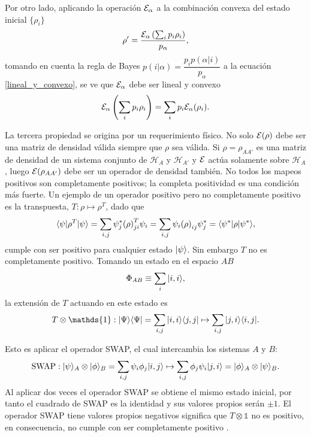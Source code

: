 Por otro lado, aplicando la operación $\mathcal{E}_\alpha$  a la combinación convexa del estado inicial $\{\rho_i\}$ \begin{equation}
    \rho'=\dfrac{\mathcal{E}_\alpha\left(\sum_i p_i \rho_i\right)}{p_\alpha},
\end{equation} tomando en cuenta la regla de Bayes  $p(i|\alpha)=\dfrac{p_i p(\alpha|i)}{ p_\alpha} $ a la ecuación {\ref{lineal_y_convexo}},  se ve que $\mathcal{E}_\alpha$ debe ser lineal y convexo {\cite{preskill2020quantum}} \begin{equation}
    \mathcal{E}_\alpha\left(\sum_i p_i \rho_i\right)=\sum_i p_i\mathcal{E}_\alpha(\rho_i). 
\end{equation}

La tercera propiedad se origina por un requerimiento físico. No solo $\mathcal{E}(\rho)$ debe ser una matriz de densidad válida siempre que $\rho$ sea válida. Si $\rho=\rho_{AA'}$ es una matriz de densidad de un sistema conjunto de $\mathcal{H}_A$ y $\mathcal{H}_{A'}$  y $\mathcal{E}$ actúa solamente sobre $\mathcal{H}_A$, luego $\mathcal{E}(\rho_{AA'})$  debe ser un operador de densidad también. No todos los mapeos positivos son completamente positivos; la completa positividad es una condición más fuerte. Un ejemplo de un operador positivo pero no completamente positivo es la transpuesta, $T:\rho \mapsto {\rho}^T$, dado que \[\langle \psi |{\rho}^T| \psi \rangle=\sum_{i,j} \psi _j^* {(\rho)}^T _{ji} \psi _i=\sum _{i,j} \psi _i{(\rho)} _{ij} \psi_j^{*}=\langle {\psi}^*|\rho|\psi ^*\rangle,\] cumple con ser positivo para cualquier estado $| \psi \rangle$. Sin embargo $ {T} $ no es completamente positivo. Tomando un estado en el espacio $AB$ \[\Phi_{AB} \equiv \sum_i |i,i\rangle, \] la extensión de $T$ actuando en este estado es \[T \otimes \mathds{1}:|\Psi\rala \Psi|=\sum_{i,j}|i,i\rala j,j| \mapsto \sum_{i,j}|j,i\rala i,j|.\]

Esto es aplicar el operador SWAP, el cual intercambia los sistemas $A$ y $B$:
\begin{equation}
    \text{SWAP}:|\psi\rangle_A\otimes|\phi\rangle_B=\sum_{i,j}\psi_i\phi_j |i,j\rangle\mapsto\sum_{i,j}\phi_j\psi_i|j,i\rangle=|\phi\rangle_A\otimes|\psi\rangle_B.
\end{equation} Al aplicar dos veces el operador SWAP se obtiene el mismo estado inicial, por tanto el cuadrado de SWAP es la identidad y sus valores propios serán $\pm 1$. El operador SWAP tiene valores propios negativos significa que $T \otimes \mathds{1}$ no es positivo, en consecuencia, no cumple con ser completamente positivo  {\cite{preskill2020quantum}}.




